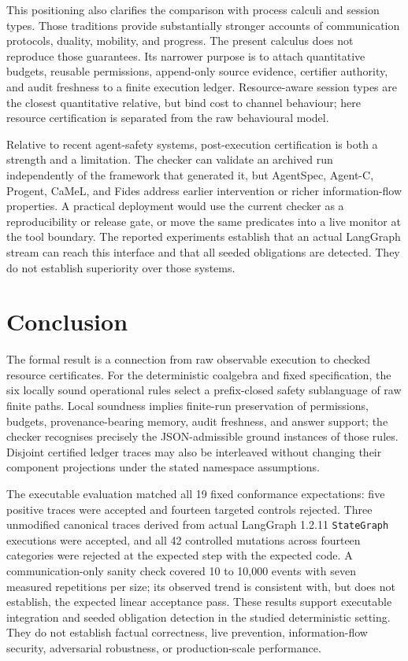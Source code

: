 \documentclass[a4paper,fleqn]{cas-sc}
\begin{document}
This positioning also clarifies the comparison with process calculi and session
types. Those traditions provide substantially stronger accounts of
communication protocols, duality, mobility, and progress. The present
calculus does not reproduce those guarantees. Its narrower purpose is to attach
quantitative budgets, reusable permissions, append-only source evidence,
certifier authority, and audit freshness to a finite execution ledger.
Resource-aware session types are the closest quantitative relative, but bind
cost to channel behaviour; here resource certification is separated from the
raw behavioural model.

Relative to recent agent-safety systems, post-execution certification is both a
strength and a limitation. The checker can validate an archived run
independently of the framework that generated it, but AgentSpec, Agent-C,
Progent, CaMeL, and Fides address earlier intervention or richer information-flow
properties. A practical deployment would use the current checker as a
reproducibility or release gate, or move the same predicates into a live monitor
at the tool boundary. The reported experiments establish that an actual
LangGraph stream can reach this interface and that all seeded obligations are
detected. They do not establish superiority over those systems.

\section{Conclusion}

The formal result is a connection from raw observable execution to checked
resource certificates. For the deterministic coalgebra and fixed
specification, the six locally sound operational rules select a prefix-closed
safety sublanguage of raw finite paths. Local soundness implies finite-run
preservation of permissions, budgets, provenance-bearing memory, audit
freshness, and answer support; the checker recognises precisely the
JSON-admissible ground instances of those rules. Disjoint certified ledger
traces may also be interleaved without changing their component projections
under the stated namespace assumptions.

The executable evaluation matched all 19 fixed conformance expectations:
five positive traces were accepted and fourteen targeted controls rejected.
Three unmodified canonical traces derived from actual LangGraph 1.2.11
\texttt{StateGraph} executions were accepted, and all 42 controlled mutations
across fourteen categories were rejected at the expected step with the
expected code. A communication-only sanity check covered 10 to 10,000 events
with seven measured repetitions per size; its observed trend is consistent
with, but does not establish, the expected linear acceptance pass. These
results support executable integration and seeded obligation detection in the
studied deterministic setting. They do not establish factual correctness,
live prevention, information-flow security, adversarial robustness, or
production-scale performance.
\end{document}
